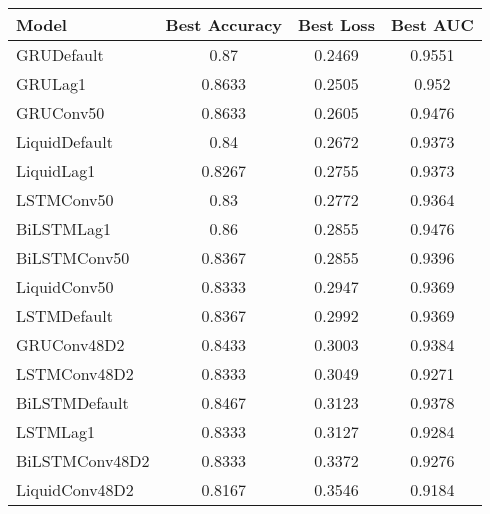 \begin{tabular}{lccc}
\toprule
Model & Best Accuracy & Best Loss & Best AUC \\
\midrule
GRUDefault & 0.87 & 0.2469 & 0.9551 \\
GRULag1 & 0.8633 & 0.2505 & 0.952 \\
GRUConv50 & 0.8633 & 0.2605 & 0.9476 \\
LiquidDefault & 0.84 & 0.2672 & 0.9373 \\
LiquidLag1 & 0.8267 & 0.2755 & 0.9373 \\
LSTMConv50 & 0.83 & 0.2772 & 0.9364 \\
BiLSTMLag1 & 0.86 & 0.2855 & 0.9476 \\
BiLSTMConv50 & 0.8367 & 0.2855 & 0.9396 \\
LiquidConv50 & 0.8333 & 0.2947 & 0.9369 \\
LSTMDefault & 0.8367 & 0.2992 & 0.9369 \\
GRUConv48D2 & 0.8433 & 0.3003 & 0.9384 \\
LSTMConv48D2 & 0.8333 & 0.3049 & 0.9271 \\
BiLSTMDefault & 0.8467 & 0.3123 & 0.9378 \\
LSTMLag1 & 0.8333 & 0.3127 & 0.9284 \\
BiLSTMConv48D2 & 0.8333 & 0.3372 & 0.9276 \\
LiquidConv48D2 & 0.8167 & 0.3546 & 0.9184 \\
\bottomrule
\end{tabular}